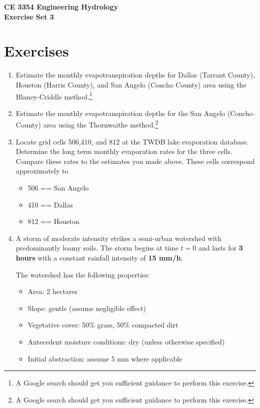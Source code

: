 \documentclass[12pt]{article}
\begin{document}
\begin{center}
{\textbf{{ CE 3354 Engineering Hydrology} \\ {Exercise Set 3}}}
\end{center}

 \section*{\small{Exercises}}
 \begin{enumerate}

\item Estimate the monthly evapotranspiration depths for Dallas (Tarrant County), Houston (Harris County), and San Angelo (Concho County) area using the Blaney-Criddle method.\footnote{A Google search should get you sufficient guidance to perform this exercise.}
\clearpage
\item Estimate the monthly evapotranspiration depths for the San Angelo (Concho County) area using the Thornwaithe method.\footnote{A Google search should get you sufficient guidance to perform this exercise.}
\clearpage
\item Locate grid cells 506,410, and 812 at the TWDB lake evaporation database. Determine the long term monthly evaporation rates for the three cells.  Compare these rates to the estimates you made above.  These cells correspond approximately to

\begin{itemize}
\item 506 == San Angelo
\item 410 == Dallas
\item 812 == Houston
\end{itemize}
\clearpage
\item A storm of moderate intensity strikes a semi-urban watershed with predominantly loamy soils. The storm begins at time $ t = 0 $ and lasts for \textbf{3 hours} with a constant rainfall intensity of \textbf{15 mm/h}.

The watershed has the following properties:

\begin{itemize}
    \item Area: 2 hectares
    \item Slope: gentle (assume negligible effect)
    \item Vegetative cover: 50\% grass, 50\% compacted dirt
    \item Antecedent moisture conditions: dry (unless otherwise specified)
    \item Initial abstraction: assume 5 mm where applicable
\end{itemize}


\end{enumerate}
\end{document}
